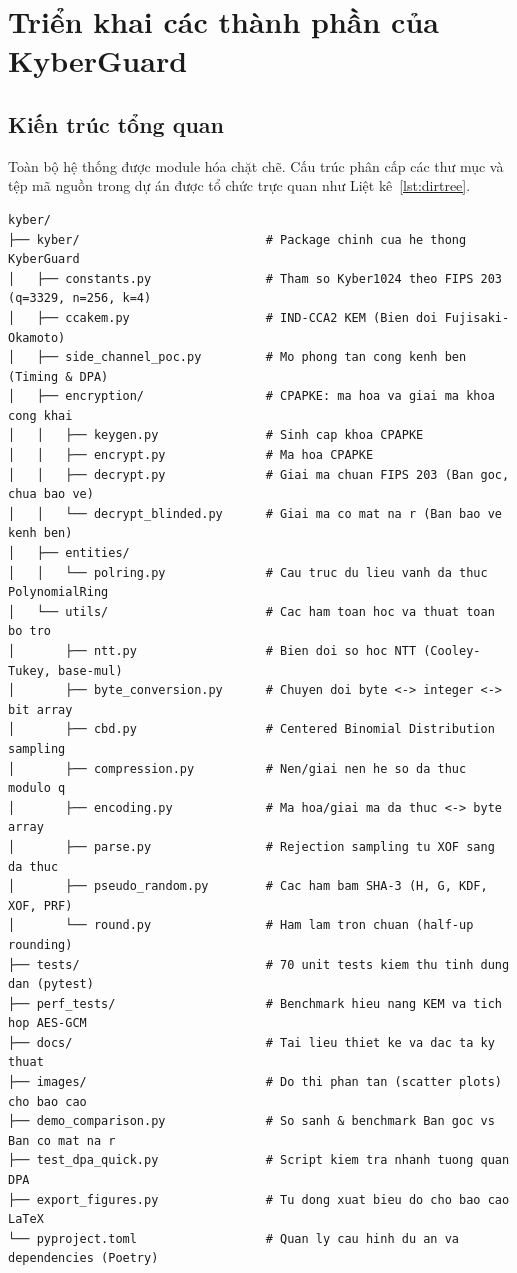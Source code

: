 \documentclass[../LuanVan.tex]{subfiles}
\begin{document}
\section{Triển khai các thành phần của KyberGuard}
\label{sec:trienkhai}

\subsection{Kiến trúc tổng quan}

Toàn bộ hệ thống được module hóa chặt chẽ. Cấu trúc phân cấp các thư mục và tệp mã nguồn trong dự án được tổ chức trực quan như Liệt kê~\ref{lst:dirtree}.

\begin{lstlisting}[style=treestyle, caption={Cấu trúc mã nguồn dự án KyberGuard}, label={lst:dirtree}]
kyber/
├── kyber/                          # Package chinh cua he thong KyberGuard
│   ├── constants.py                # Tham so Kyber1024 theo FIPS 203 (q=3329, n=256, k=4)
│   ├── ccakem.py                   # IND-CCA2 KEM (Bien doi Fujisaki-Okamoto)
│   ├── side_channel_poc.py         # Mo phong tan cong kenh ben (Timing & DPA)
│   ├── encryption/                 # CPAPKE: ma hoa va giai ma khoa cong khai
│   │   ├── keygen.py               # Sinh cap khoa CPAPKE
│   │   ├── encrypt.py              # Ma hoa CPAPKE
│   │   ├── decrypt.py              # Giai ma chuan FIPS 203 (Ban goc, chua bao ve)
│   │   └── decrypt_blinded.py      # Giai ma co mat na r (Ban bao ve kenh ben)
│   ├── entities/
│   │   └── polring.py              # Cau truc du lieu vanh da thuc PolynomialRing
│   └── utils/                      # Cac ham toan hoc va thuat toan bo tro
│       ├── ntt.py                  # Bien doi so hoc NTT (Cooley-Tukey, base-mul)
│       ├── byte_conversion.py      # Chuyen doi byte <-> integer <-> bit array
│       ├── cbd.py                  # Centered Binomial Distribution sampling
│       ├── compression.py          # Nen/giai nen he so da thuc modulo q
│       ├── encoding.py             # Ma hoa/giai ma da thuc <-> byte array
│       ├── parse.py                # Rejection sampling tu XOF sang da thuc
│       ├── pseudo_random.py        # Cac ham bam SHA-3 (H, G, KDF, XOF, PRF)
│       └── round.py                # Ham lam tron chuan (half-up rounding)
├── tests/                          # 70 unit tests kiem thu tinh dung dan (pytest)
├── perf_tests/                     # Benchmark hieu nang KEM va tich hop AES-GCM
├── docs/                           # Tai lieu thiet ke va dac ta ky thuat
├── images/                         # Do thi phan tan (scatter plots) cho bao cao
├── demo_comparison.py              # So sanh & benchmark Ban goc vs Ban co mat na r
├── test_dpa_quick.py               # Script kiem tra nhanh tuong quan DPA
├── export_figures.py               # Tu dong xuat bieu do cho bao cao LaTeX
└── pyproject.toml                  # Quan ly cau hinh du an va dependencies (Poetry)
\end{lstlisting}
\end{document}
